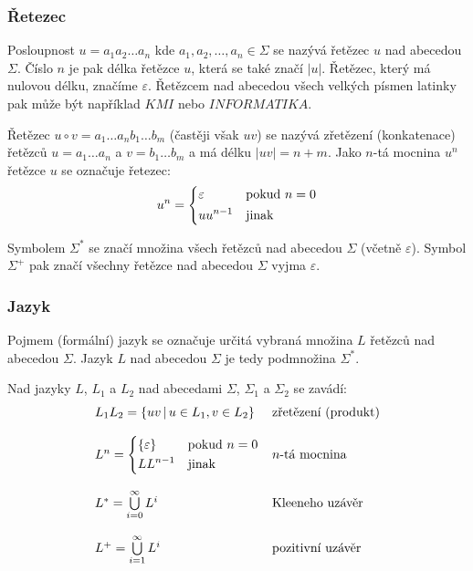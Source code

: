\documentclass[a4paper,10pt]{article}
\begin{document}
\subsubsection*{Řetezec}
Posloupnost $u = a_1 a_2 \dots a_n$ kde $a_1,  a_2, \dots, a_n \in \Sigma$ se nazývá řetězec $u$ nad abecedou $\Sigma$. Číslo $n$ je pak délka řetězce $u$, která se také značí $|u|$. Řetězec, který má nulovou délku, značíme $\varepsilon$. Řetězcem nad abecedou všech velkých písmen latinky pak může být například $KMI$ nebo $INFORMATIKA$.

Řetězec $u \circ v = a_1 \dots a_n b_1 \dots b_m$ (častěji však $uv$) se nazývá zřetězení (konkatenace) řetězců $u = a_1 \dots a_n$ a $v = b_1 \dots b_m$ a má délku $|uv| = n + m$. Jako $n$-tá mocnina $u^n$ řetězce $u$ se označuje řetezec:
$$
  u^n = \begin{dcases}
    \varepsilon & \text{pokud } n = 0\\
    u u^{n-1} & \text{jinak}
  \end{dcases}
$$

Symbolem $\Sigma^*$ se značí množina všech řetězců nad abecedou $\Sigma$ (včetně $\varepsilon$). Symbol $\Sigma^+$ pak značí všechny řetězce nad abecedou $\Sigma$ vyjma $\varepsilon$. %

\subsubsection*{Jazyk}
Pojmem (formální) jazyk se označuje určitá vybraná množina $L$ řetězců nad abecedou $\Sigma$. Jazyk $L$ nad abecedou $\Sigma$ je tedy podmnožina $\Sigma^*$. 

Nad jazyky $L$, $L_1$ a $L_2$ nad abecedami $\Sigma$, $\Sigma_1$ a $\Sigma_2$ se zavádí:
$$
\begin{array}{ll}
  L_1 L_2 		= \left\{ u v \,|\, u \in L_1, v \in L_2 \right\}	& \text{zřetězení (produkt)}	\\ \\
  L^n 			= \begin{dcases}
      \left\{ \varepsilon \right\} 	& \text{pokud } n = 0 \\
      L L^{n-1} 			& \text{jinak}
    \end{dcases} 								& \text{$n$-tá mocnina}		\\ \\
  
  L^* 	= \bigcup\limits_{i=0}^{\infty} L^i						& \text{Kleeneho uzávěr}	\\ \\
  L^+ 	= \bigcup\limits_{i=1}^{\infty} L^i						& \text{pozitivní uzávěr}
\end{array}
$$
\end{document}
